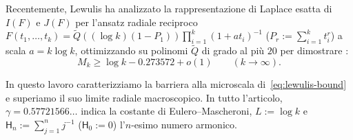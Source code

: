 \documentclass[11pt, reqno]{amsart}
\theoremstyle{remark}
\numberwithin{equation}{section}
\newcommand{\Harm}{\mathsf{H}}
\begin{document}
Recentemente, Lewulis \cite{Lewulis} ha analizzato la rappresentazione di Laplace esatta di $I(F)$
e $J(F)$ per l'ansatz radiale reciproco
$F(t_1,\dots,t_k) = \widetilde{Q}((\log k)(1-P_1)) \prod_{i=1}^k (1 + a t_i)^{-1}$
($P_r := \sum_{i=1}^k t_i^r$) a scala $a = k\log k$, ottimizzando su polinomi $\widetilde{Q}$
di grado al più $20$ per dimostrare \cite[Teorema~3]{Lewulis}:
\begin{equation}\label{eq:lewulis-bound}
M_k \ge \log k - 0.273572 + o(1) \qquad (k \to \infty).
\end{equation}

In questo lavoro caratterizziamo la barriera alla microscala di~\eqref{eq:lewulis-bound} e
superiamo il suo limite radiale macroscopico. In tutto l'articolo, $\gamma = 0.57721566\dots$
indica la costante di Eulero--Mascheroni, $L := \log k$ e $\Harm_n := \sum_{j=1}^n j^{-1}$
($\Harm_0 := 0$) l'$n$-esimo numero armonico.
\end{document}
